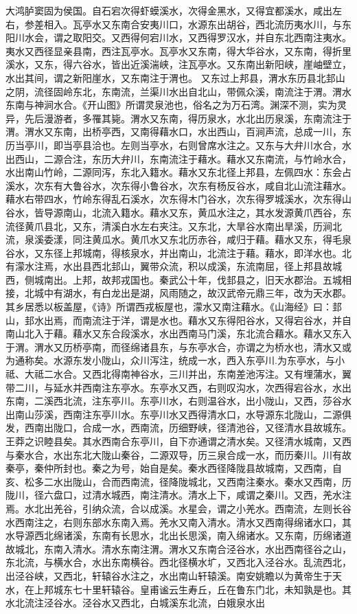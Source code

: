\documentclass[12pt,UTF8]{ctexbook}
\begin{document}
大鸿胪窦固为侯国。自石宕次得虾蟆溪水，次得金黑水，又得宜都溪水，咸出左右，参差相入。瓦亭水又东南合安夷川口，水源东出胡谷，西北流历夷水川，与东阳川水会，谓之取阳交。又西得何宕川水，又西得罗汉水，并自东北西南注夷水。夷水又西径显亲县南，西注瓦亭水。瓦亭水又东南，得大华谷水，又东南，得折里溪水，又东，得六谷水，皆出近溪湍峡，注瓦亭水。又东南出新阳峡，崖岫壁立，水出其间，谓之新阳崖水，又东南注于渭也。
又东过上邦县，渭水东历县北邽山之阴，流径固岭东北，东南流，兰渠川水出自北山，带佩众溪，南流注于渭。渭水东南与神涧水合。《开山图》所谓灵泉池也，俗名之为万石湾。渊深不测，实为灵异，先后漫游者，多罹其毙。渭水又东南，得历泉水，水北出历泉溪，东南流注于渭。渭水又东南，出桥亭西，又南得藉水口，水出西山，百涧声流，总成一川，东历当亭川，即当亭县洽也。左则当亭水，右则曾席水注之。又东与大弁川水合，水出西山，二源合注，东历大弁川，东南流注于藉水。藉水又东南流，与竹岭水合，水出南山竹岭，二源同泻，东北入籍水。藉水又东北径上邦县，左佩四水：东会占溪水，次东有大鲁谷水，次东得小鲁谷水，次东有杨反谷水，咸自北山流注藉水。藉水右带四水，竹岭东得乱石溪水，次东得木门谷水，次东得罗城溪水，次东得山谷水，皆导源南山，北流入籍水。藉水又东，黄瓜水注之，其水发源黄爪西谷，东流径黄爪县北，又东，清溪白水左右夹注。又东北，大旱谷水南出旱溪，历涧北流，泉溪委漾，同注黄瓜水。黄爪水又东北历赤谷，咸归于藉。藉水又东，得毛泉谷水，又东径上邦城南，得核泉水，并出南山，北流注于藉。藉水，即洋水也。北有濛水注焉，水出县西北邽山，翼带众流，积以成溪，东流南屈，径上邦县故城西，侧城南出。上邦，故邦戎国也。秦武公十年，伐邽县之，旧天水郡治。五城相接，北城中有湖水，有白龙出是湖，风雨随之，故汉武帝元鼎三年，改为天水郡。其乡居悉以板盖屋，《诗》所谓西戎板屋也，濛水又南注藉水。《山海经》曰：邽山，邽水出焉，而南流注于洋，谓是水也。藉水又东得阳谷水，又得宕谷水，并自南山北入于藉。藉水又东合段溪水，水出西南马门溪，东北流合藉水。藉水又东入于渭。渭水又历桥亭南，而径绵诸县东，与东亭水合，亦谓之为桥水也，清水又或为通称矣。水源东发小陇山，众川泻注，统成一水，西入东亭川.为东亭水，与小祗、大祗二水合。又西北得南神谷水，三川并出，东南差池泻注。又有埋蒲水，翼带二川，与延水并西南注东亭水。东亭水又西，右则叹沟水，次西得宕谷水，水出东南，二溪西北流，注东亭川。东亭川水，右则温谷水，出小陇山，又西，莎谷水出南山莎溪，西南注东亭川水。东亭川水又西得清水口，水导源东北陇山，二源俱发，西南出陇口，合成一水，西南流，历细野峡，径清池谷，又径清水县故城东。王莽之识睦县矣。其水西南合东亭川，自下亦通谓之清水矣。又径清水城南，又西与秦水合，水出东北大陇山秦谷，二源双导，历三泉合成一水，而历秦川。川有故秦亭，秦仲所封也。秦之为号，始自是矣。秦水西径降陇县故城南，又西南，自亥、松多二水出陇山，合而西南流，径降陇城北，又西南注秦水。秦水又西南，历陇川，径六盘口，过清水城西，南注清水。清水上下，咸谓之秦川。又西，羌水注焉。水北出羌谷，引纳众流，合以成溪。水星会，谓之小羌水。西南流，左则长谷水西南注之，右则东部水东南入焉。羌水又南入清水。清水又西南得绵诸水口，其水导源西北绵诸溪，东南有长思水，北出长思溪，南入绵诸水。又东南，历绵诸道故城北，东南入清水。清水东南注渭。渭水又东南合泾谷水，水出西南径谷之山，东北流，与横水合，水出东南横谷。西北径横水圹，又西北入泾谷水。乱流西北，出泾谷峡，又西北，轩辕谷水注之，水出南山轩辕溪。南安姚瞻以为黄帝生于天水，在上邦城东七十里轩辕谷。皇甫谧云生寿丘，丘在鲁东门北，未知孰是也。其水北流注泾谷水。泾谷水又西北，白城溪东北流，白娥泉水出
\end{document}
